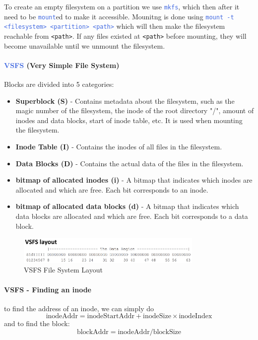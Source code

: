 \documentclass[openany,12pt]{book}
\newcommand{\code}[1]{\texttt{#1}}
\newcommand{\blue}[1]{\textcolor{RoyalBlue}{#1}}
\begin{document}
To create an empty filesystem on a partition we use \blue{\code{mkfs}}, which then after it need to be \blue{\code{mount}}ed to make it accessible. Mounitng is done using \blue{\code{mount -t <filesystem> <partition> <path>}} which will then make the filesystem reachable from \code{<path>}. If any files existed at \code{<path>} before mounting, they will become unavailable until we unmount the filesystem.




\paragraph{\blue{VSFS} (Very Simple File System)} Blocks are divided into 5 categories:
\begin{itemize}
  \item \textbf{Superblock (S)} - Contains metadata about the filesystem, such as the magic number of the filesystem, the inode of the root directory "/", amount of inodes and data blocks, start of inode table, etc. It is used when mounting the filesystem.

  \item \textbf{Inode Table (I)} - Contains the inodes of all files in the filesystem.

  \item \textbf{Data Blocks (D)} - Contains the actual data of the files in the filesystem.

  \item \textbf{bitmap of allocated inodes (i)} - A bitmap that indicates which inodes are allocated and which are free. Each bit corresponds to an inode.

  \item \textbf{bitmap of allocated data blocks (d)} - A bitmap that indicates which data blocks are allocated and which are free. Each bit corresponds to a data block.
\end{itemize}

\begin{figure}[H]
    \centering
    \includegraphics[width=0.8\textwidth]{VSFS_layout.png}
    \caption{VSFS File System Layout}
    \label{fig:vsfs}
\end{figure}

\paragraph{VSFS - Finding an inode} to find the address of an inode, we can simply do
\begin{equation*}
  \text{inodeAddr} = \text{inodeStartAddr} + \text{inodeSize} \times \text{inodeIndex}
\end{equation*}
and to find the block:
\begin{equation*}
  \text{blockAddr} = \text{inodeAddr}/\text{blockSize}
\end{equation*}
\end{document}

